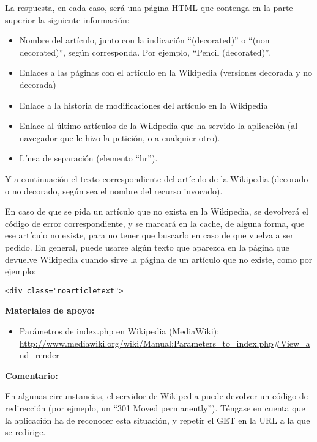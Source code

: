 La respuesta, en cada caso, será una página HTML que contenga en la parte superior la siguiente información:

\begin{itemize}
\item Nombre del artículo, junto con la indicación ``(decorated)'' o ``(non decorated)'', según corresponda. Por ejemplo, ``Pencil (decorated)''.
\item Enlaces a las páginas con el artículo en la Wikipedia (versiones decorada y no decorada)
\item Enlace a la historia de modificaciones del artículo en la Wikipedia
\item Enlace al último artículos de la Wikipedia que ha servido la aplicación (al navegador que le hizo la petición, o a cualquier otro).
\item Línea de separación (elemento ``hr'').
\end{itemize}

Y a continuación el texto correspondiente del  artículo de la Wikipedia (decorado o no decorado, según sea el nombre del recurso invocado).

En caso de que se pida un artículo que no exista en la Wikipedia, se devolverá el código de error correspondiente, y se marcará en la cache, de alguna forma, que ese artículo no existe, para no tener que buscarlo en caso de que vuelva a ser pedido. En general, puede usarse algún texto que aparezca en la página que devuelve Wikipedia cuando sirve la página de un artículo que no existe, como por ejemplo:

\begin{verbatim}
<div class="noarticletext">
\end{verbatim}

\textbf{Materiales de apoyo:}

\begin{itemize}
\item Parámetros de index.php en Wikipedia (MediaWiki):
\url{http://www.mediawiki.org/wiki/Manual:Parameters_to_index.php#View_and_render}
\end{itemize}

\textbf{Comentario:}

En algunas circunstancias, el servidor de Wikipedia puede devolver un código de redirección (por ejmeplo, un ``301 Moved permanently''). Téngase en cuenta que la aplicación ha de reconocer esta situación, y repetir el GET en la URL a la que se redirige.

